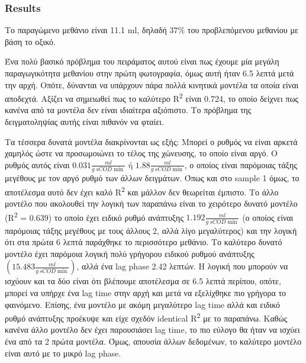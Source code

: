 \documentclass[11pt]{article}
\begin{document}
\subsubsection{Results}
\label{sec:org1947700}
Το παραγώμενο μεθάνιο είναι 11.1 ml, δηλαδή \(37 \%\) του προβλεπόμενου μεθανίου με βάση το οξικό.

Ένα πολύ βασικό πρόβλημα του πειράματος αυτού είναι πως έχουμε μία μεγάλη παραγωγικότητα μεθανίου στην πρώτη φωτογραφία, όμως αυτή ήταν 6.5 λεπτά μετά την αρχή. Οπότε, δύνανται να υπάρχουν πάρα πολλά κινητικά μοντέλα τα οποία είναι αποδεχτά. Αξίζει να σημειωθεί πως το καλύτερο R\textsuperscript{2} είναι 0.724, το οποίο δείχνει πως κανένα από τα μοντέλα δεν είναι ιδιαίτερα αξιόπιστο. Το πρόβλημα της δειγματοληψίας αυτής είναι πιθανόν να φταίει.

Τα τέσσερα δυνατά μοντέλα διακρίνονται ως εξής: Μπορεί ο ρυθμός να είναι αρκετά χαμηλός ώστε να προσωμοιώνει το τέλος της χώνευσης, το οποίο είναι αργό. Ο ρυθμός αυτός είναι \(0.031 \frac{ml}{g ~ sCOD \min } \text{ ή } 1.88 \frac{ml}{g ~ sCOD \min }\), ο οποίος είναι παρόμοιας τάξης μεγέθους με τον αργό ρυθμό των άλλων δειγμάτων. Όπως και στο sample 1 όμως, το αποτέλεσμα αυτό δεν έχει καλό R\textsuperscript{2} και μάλλον δεν θεωρείται έμπιστο. Το άλλο μοντέλο που ακολουθεί την λογική των παραπάνω είναι το χειρότερο δυνατό μοντέλο (R\textsuperscript{2} = 0.639) το οποίο έχει ειδικό ρυθμό ανάπτυξης \(1.192 \frac{ml}{g ~ sCOD \min }\) (ο οποίος είναι παρόμοιας τάξης μεγέθους με τους άλλους 2, αλλά λίγο μεγαλύτερος) και την λογική ότι στα πρώτα 6 λεπτά παράχθηκε το περισσότερο μεθάνιο. Το καλύτερο δυνατό μοντέλο έχει παρόμοια λογική πολύ γρήγορου ειδικού ρυθμού ανάπτυξης \(\left( 15.483 \frac{ml}{g ~ sCOD \min } \right)\), αλλά ένα lag phase 2.42 λεπτών. Η λογική που μπορούν να ισχύουν και τα δύο είναι ότι βλέπουμε αποτέλεσμα σε 6.5 λεπτά περίπου, οπότε, μπορεί να υπήρχε ένα lag time στην αρχή και μετά να εξελίχθηκε πιο γρήγορα το φαινόμενο. Επίσης, ένα μοντέλο με ακόμη μεγαλύτερο lag time αλλά και ειδικό ρυθμό ανάπτυξης προέκυψε και είχε σχεδόν identical R\textsuperscript{2} με το παραπάνω. Καθώς κανένα άλλο μοντέλο δεν έχει παρουσιάσει lag time, το πιο εύλογο θα ήταν να ισχύει ένα από τα 2 πρώτα μοντέλα. Όμως, απουσία άλλων δεδομένων, το καλύτερο μοντέλο είναι αυτό με το μικρό lag phase.
\end{document}
